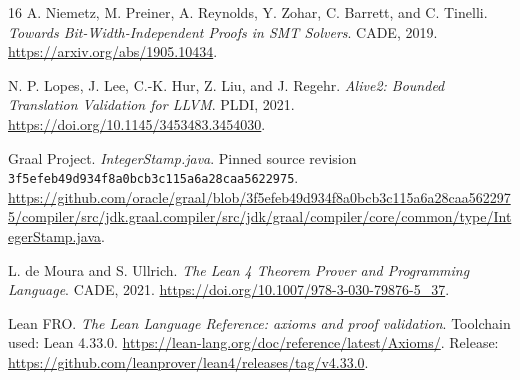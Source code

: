 \begin{thebibliography}{16}
A. Niemetz, M. Preiner, A. Reynolds, Y. Zohar, C. Barrett, and C. Tinelli.
\emph{Towards Bit-Width-Independent Proofs in SMT Solvers}.
CADE, 2019. \url{https://arxiv.org/abs/1905.10434}.

N. P. Lopes, J. Lee, C.-K. Hur, Z. Liu, and J. Regehr.
\emph{Alive2: Bounded Translation Validation for LLVM}.
PLDI, 2021. \url{https://doi.org/10.1145/3453483.3454030}.

Graal Project.
\emph{IntegerStamp.java}.
Pinned source revision \nolinkurl{3f5efeb49d934f8a0bcb3c115a6a28caa5622975}.
\url{https://github.com/oracle/graal/blob/3f5efeb49d934f8a0bcb3c115a6a28caa5622975/compiler/src/jdk.graal.compiler/src/jdk/graal/compiler/core/common/type/IntegerStamp.java}.

L. de Moura and S. Ullrich.
\emph{The Lean 4 Theorem Prover and Programming Language}.
CADE, 2021. \url{https://doi.org/10.1007/978-3-030-79876-5_37}.

Lean FRO.
\emph{The Lean Language Reference: axioms and proof validation}.
Toolchain used: Lean 4.33.0.
\url{https://lean-lang.org/doc/reference/latest/Axioms/}.
Release: \url{https://github.com/leanprover/lean4/releases/tag/v4.33.0}.

\end{thebibliography}
